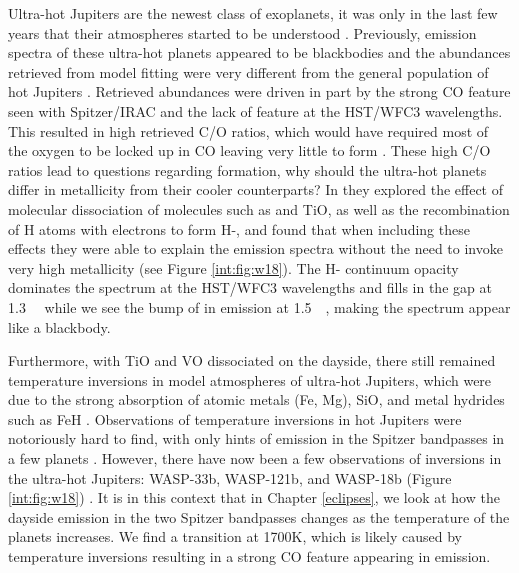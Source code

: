 Ultra-hot Jupiters are the newest class of exoplanets, it was only in the last few years that their atmospheres started to be understood \citep[e.g.,][]{Arcangeli2018, Parmentier2018b, Lothringer2018, Kitzmann2018}. Previously, emission spectra of these ultra-hot planets appeared to be blackbodies and the abundances retrieved from model fitting were very different from the general population of hot Jupiters \citep{Stevenson2014b, Haynes2015,Evans2017,Sheppard2017}. Retrieved abundances were driven in part by the strong CO feature seen with Spitzer/IRAC and the lack of  feature at the HST/WFC3 wavelengths. This resulted in high retrieved C/O ratios, which would have required most of the oxygen to be locked up in CO leaving very little to form . These high C/O ratios lead to questions regarding formation, why should the ultra-hot planets differ in metallicity from their cooler counterparts? In \citet{Arcangeli2018} they explored the effect of molecular dissociation of molecules such as  and TiO, as well as the recombination of H atoms with electrons to form H-, and found that when including these effects they were able to explain the emission spectra without the need to invoke very high metallicity (see Figure \ref{int:fig:w18}). The H- continuum opacity dominates the spectrum at the HST/WFC3 wavelengths and fills in the gap at 1.3~\um~ while we see the bump of  in emission at 1.5~\um~, making the spectrum appear like a blackbody.

Furthermore, with TiO and VO dissociated on the dayside, there still remained temperature inversions in model atmospheres of ultra-hot Jupiters, which were due to the strong absorption of atomic metals (Fe, Mg), SiO, and metal hydrides such as FeH \citep{Lothringer2018}. Observations of temperature inversions in hot Jupiters were notoriously hard to find, with only hints of emission in the Spitzer bandpasses in a few planets \citep[e.g.,][]{Nymeyer2011, Deming2012}. However, there have now been a few observations of inversions in the ultra-hot Jupiters: WASP-33b, WASP-121b, and WASP-18b (Figure \ref{int:fig:w18}) \citep{Haynes2015, vonEssen2015, Evans2017, Arcangeli2018, Kreidberg2018b}. It is in this context that in Chapter \ref{eclipses}, we look at how the dayside emission in the two Spitzer bandpasses changes as the temperature of the planets increases. We find a transition at 1700K, which is likely caused by temperature inversions resulting in a strong CO feature appearing in emission.

